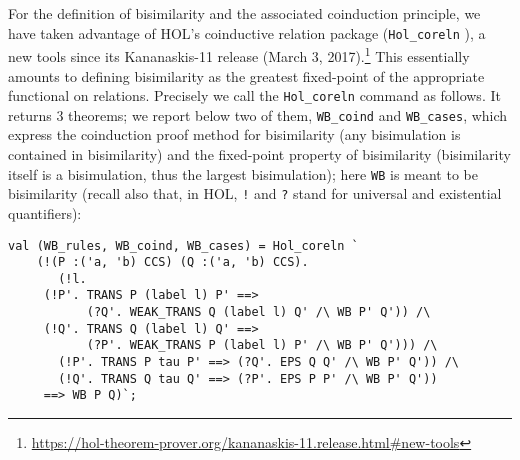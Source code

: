 For the definition of bisimilarity and the associated coinduction
principle, 
we have  taken
advantage of HOL's coinductive relation package (\texttt{Hol_coreln} \cite{Anonymous:Iu-sOoz1}),
a new tools since its Kananaskis-11 release (March 3,
2017).\footnote{\url{https://hol-theorem-prover.org/kananaskis-11.release.html\#new-tools}}
This essentially amounts to defining bisimilarity as the greatest
fixed-point of the appropriate functional on relations. 
Precisely we call 
the \texttt{Hol_coreln}
command as follows. It returns 3 theorems; we report below  two of them, 
\texttt{WB_coind} and \texttt{WB_cases},
which 
express the coinduction proof method for bisimilarity 
(any bisimulation is contained in bisimilarity)
and the fixed-point property of bisimilarity
(bisimilarity itself is a bisimulation, thus the largest
bisimulation); here
  \texttt{WB} is meant to be bisimilarity
(recall also that, in HOL, {\tt !} and  {\tt ?}  stand for universal and
existential quantifiers):
\begin{lstlisting}
val (WB_rules, WB_coind, WB_cases) = Hol_coreln `
    (!(P :('a, 'b) CCS) (Q :('a, 'b) CCS).
       (!l.
	 (!P'. TRANS P (label l) P' ==>
	       (?Q'. WEAK_TRANS Q (label l) Q' /\ WB P' Q')) /\
	 (!Q'. TRANS Q (label l) Q' ==>
	       (?P'. WEAK_TRANS P (label l) P' /\ WB P' Q'))) /\
       (!P'. TRANS P tau P' ==> (?Q'. EPS Q Q' /\ WB P' Q')) /\
       (!Q'. TRANS Q tau Q' ==> (?P'. EPS P P' /\ WB P' Q'))
     ==> WB P Q)`;
\end{lstlisting}
